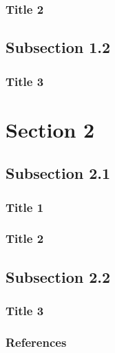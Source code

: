 \documentclass[aspectratio=169]{beamer}
\begin{document}
  \begin{frame}
    \frametitle{Title 2} 
    \lipsum[2]
  \end{frame}

  \subsection{Subsection 1.2}
  \begin{frame}[plain]
    \frametitle{Title 3} 
    \lipsum[3]
  \end{frame}

\section{Section 2}
  \subsection{Subsection 2.1}
  \begin{frame}
    \frametitle{Title 1} 
    \lipsum[4]
  \end{frame}

  \begin{frame}
    \frametitle{Title 2} 
    \lipsum[5]
  \end{frame}

  \subsection{Subsection 2.2}
  \begin{frame}[plain]
    \frametitle{Title 3} 
    \lipsum[6]
  \end{frame}

  \begin{frame}
    \frametitle{References}
    \printbibliography[heading=none]
  \end{frame}
\end{document}
